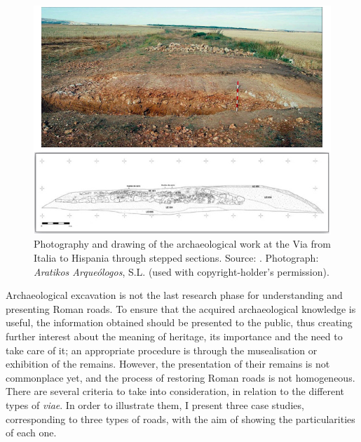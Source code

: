 		\begin{figure}[!htb]
			\includegraphics[width=.95\linewidth]{figures/verdu_Fig4}
			\centering
			\caption{Photography and drawing of the archaeological work at the Via from Italia to Hispania through stepped sections. Source: \textcite[64]{Palomino_2010}. Photograph: \textit{Aratikos Arqueólogos}, S.L. (used with copyright-holder’s permission).}
			\label{fig:verdu_Fig4}
		\end{figure}	
Archaeological excavation is not the last research phase for understanding and presenting Roman roads. To ensure that the acquired archaeological knowledge is useful, the information obtained should be presented to the public, thus creating further interest about the meaning of heritage, its importance and the need to take care of it; an appropriate procedure is through the musealisation or exhibition of the remains. However, the presentation of their remains is not commonplace yet, and the process of restoring Roman roads is not homogeneous. There are several criteria to take into consideration, in relation to the different types of \textit{viae}. In order to illustrate them, I present three case studies, corresponding to three types of roads, with the aim of showing the particularities of each one. 


